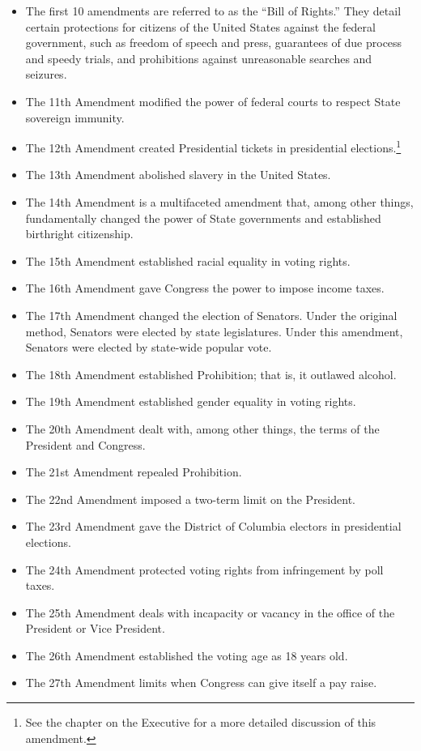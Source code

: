 \begin{itemize}
\item The first 10 amendments are referred to as the ``Bill of Rights.'' They detail certain protections for citizens of the United States against the federal government, such as freedom of speech and press, guarantees of due process and speedy trials, and prohibitions against unreasonable searches and seizures.
\item The 11th Amendment modified the power of federal courts to respect State sovereign immunity.
\item The 12th Amendment created Presidential tickets in presidential elections.\footnote{See the chapter on the Executive for a more detailed discussion of this amendment.}
\item The 13th Amendment abolished slavery in the United States.
\item The 14th Amendment is a multifaceted amendment that, among other things, fundamentally changed the power of State governments and established birthright citizenship.
\item The 15th Amendment established racial equality in voting rights.
\item The 16th Amendment gave Congress the power to impose income taxes.
\item The 17th Amendment changed the election of Senators.  Under the original method, Senators were elected by state legislatures.  Under this amendment, Senators were elected by state-wide popular vote.
\item The 18th Amendment established Prohibition; that is, it outlawed alcohol.
\item The 19th Amendment established gender equality in voting rights. 
\item The 20th Amendment dealt with, among other things, the terms of the President and Congress.
\item The 21st Amendment repealed Prohibition.
\item The 22nd Amendment imposed a two-term limit on the President.
\item The 23rd Amendment gave the District of Columbia electors in presidential elections.
\item The 24th Amendment protected voting rights from infringement by poll taxes.
\item The 25th Amendment deals with incapacity or vacancy in the office of the President or Vice President.
\item The 26th Amendment established the voting age as 18 years old.
\item The 27th Amendment  limits when Congress can give itself a pay raise.
\end{itemize}

